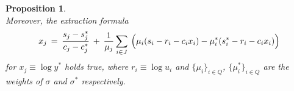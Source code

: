 \documentclass[10pt, psamsfonts, reqno]{amsart}
\newtheorem{prop}[thm]{Proposition}
\theoremstyle{definition}
\theoremstyle{remark}
\numberwithin{equation}{section}
\begin{document}
\begin{prop}
\begin{equation}
\end{equation}
Moreover, the extraction formula
\vspace{5pt}
\begin{equation}\label{orst_extraction}
x_j
\hspace{2pt}
=
\hspace{2pt}
\frac{s_j - s_j^*}{c_j - c_j^*}
\hspace{2pt}
+
\hspace{2pt}
\frac{1}{\mu_j} \sum_{i \in J}
\hspace{2pt}
\Big(
	\mu_i (s_i - r_i - c_i x_i) -
	\mu_i^* (s_i^* - r_i - c_i x_i)
\Big)
\vspace{5pt}
\end{equation}
for $x_j \equiv \log y^*$ holds true, where
$r_i \equiv \log u_i$
and 
$\{\mu_i\}_{i \in Q}$, $\{\mu_i^*\}_{i \in Q}$
are the weights of
$\sigma$ and $\sigma^*$ respectively.
\end{prop}
\end{document}
